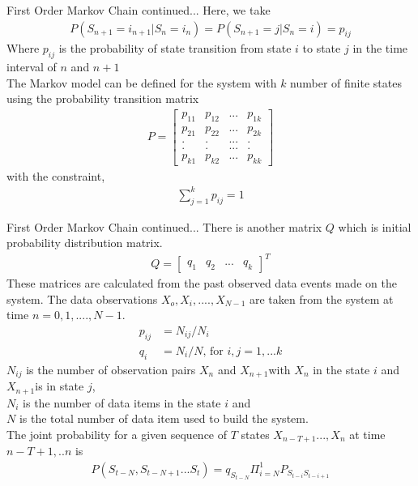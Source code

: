 \documentclass{beamer}
\begin{document}
\begin{frame}{First Order Markov Chain continued...}
Here, we take
\begin{align}
    P(S_{n+1}=i_{n+1}|S_n=i_n)=P(S_{n+1}=j|S_n=i)=p_{ij}
\end{align}
Where $p_{ij}$ is the probability of state transition from state $i$ to state $j$ in the time interval of $n$ and $n+1$\\
The Markov model can be defined for the system with $k$ number of finite states using the probability transition matrix 
\begin{align}
    P=\begin{bmatrix}
p_{11}&p_{12}&...&p_{1k}\\
p_{21}&p_{22}&...&p_{2k}\\
.&.&...&.\\
.&.&...&.\\
p_{k1}&p_{k2}&...&p_{kk}
\end{bmatrix}   \label{eq3}
\end{align}
with the constraint,
\begin{align}
    \sum_{j=1}^k p_{ij}=1   \label{eq4}
\end{align}
\end{frame}

\begin{frame}{First Order Markov Chain continued...}
There is another matrix $Q$ which is initial probability distribution matrix.
\begin{align}
    Q=\begin{bmatrix}
q_1&q_2&...&q_k
\end{bmatrix}^T \label{eq5}
\end{align}
These matrices are calculated from the past observed data events made on the system. The data observations $X_o, X_i, ...., X_{N-1}$ are taken from the system at time $n =0,1, ...., N-1$.
\begin{align}
    p_{ij}&=N_{ij}/N_i\\
    q_i&=N_i/N \text{, for }i,j=1,...k 
\end{align}
$N_{ij}$ is the number of observation pairs $X_n$ and $X_{n+1}$with $X_n$ in the state $i$ and $X_{n+1}$is in state $j$,\\
$N_i$ is the number of data items in the state $i$ and\\
$N$ is the total number of data item used to build the system.\\
The joint probability for a given sequence of $T$ states $X_{n-T+1}...,X_n$ at time $n-T+1,..n$ is
\begin{align}
    P(S_{t-N},S_{t-N+1}...S_t)=q_{S_{t-N}}\Pi_{i=N}^1 P_{S_{t-i}S_{t-i+1}}
\end{align}
\end{frame}
\end{document}

